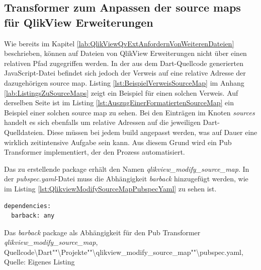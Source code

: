 

\subsection{Transformer zum Anpassen der source maps für QlikView Erweiterungen}
\label{lab:TransformerZumAnpassenDerSourceMapsFürQlikViewErweiterungen} 

Wie bereits im Kapitel \ref{lab:QlikViewQvExtAnfordernVonWeiterenDateien} beschrieben, können auf Dateien von QlikView Erweiterungen nicht über einen relativen Pfad zugegriffen werden. In der aus dem Dart-Quellcode generierten JavaScript-Datei befindet sich jedoch der Verweis auf eine relative Adresse der dazugehörigen source map. Listing \ref{lst:BeispielVerweisSourceMap} im Anhang \ref{lab:ListingsZuSourceMaps} zeigt ein Beispiel für einen solchen Verweis. Auf derselben Seite ist im Listing \ref{lst:AuszugEinerFormatiertenSourceMap} ein Beispiel einer solchen source map zu sehen. Bei den Einträgen im Knoten \textit{sources} handelt es sich ebenfalls um relative Adressen auf die jeweiligen Dart-Quelldateien. Diese müssen bei jedem build angepasst werden, was auf Dauer eine wirklich zeitintensive Aufgabe sein kann. Aus diesem Grund wird ein Pub Transformer implementiert, der den Prozess automatisiert.

Das zu erstellende package erhält den Namen \textit{qlikview\_modify\_source\_map}. In der \textit{pubspec.yaml}-Datei muss die Abhängig\-keit \textit{barback} hinzugefügt werden, wie im Listing \ref{lst:QlikviewModifySourceMapPubspecYaml} zu sehen ist.

\begin{listing}[htbp]
\begin{verbatim}
dependencies:
  barback: any
\end{verbatim}
\caption[Das \textit{barback} package als Abhängig\-keit für den Pub Transformer]{Das \textit{barback} package als Abhängig\-keit für den Pub Transformer \textit{qlikview\_modify\_source\_map}, Quellcode\textbackslash{}Dart""\textbackslash{}Projekte""\textbackslash{}qlikview\_modify\_source\_map""\textbackslash{}pubspec.yaml, Quelle: Eigenes Listing}
\label{lst:QlikviewModifySourceMapPubspecYaml}
\end{listing}


